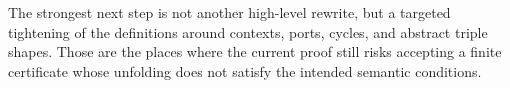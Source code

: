 \documentclass[11pt]{article}
\begin{document}
The strongest next step is not another high-level rewrite, but a targeted tightening of the definitions around contexts, ports, cycles, and abstract triple shapes.  Those are the places where the current proof still risks accepting a finite certificate whose unfolding does not satisfy the intended semantic conditions.
\end{document}
